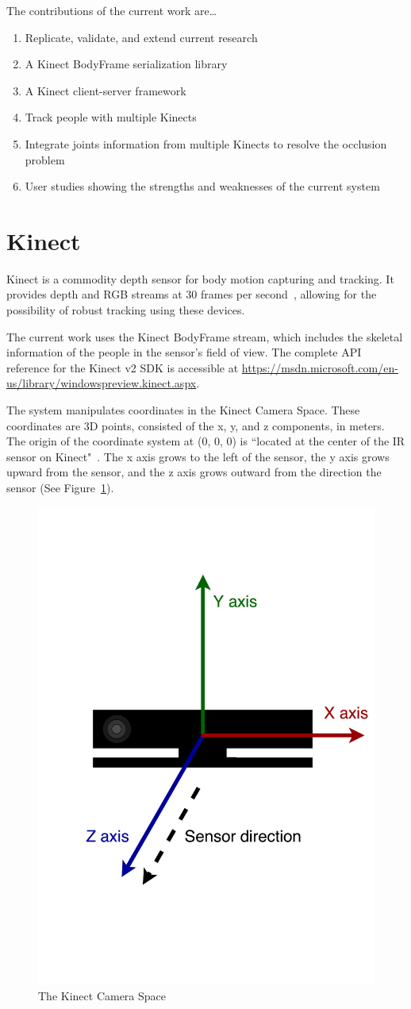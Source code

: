 The contributions of the current work are\ldots

\begin{enumerate}
  \item Replicate, validate, and extend current research
  \item A Kinect BodyFrame serialization library
  \item A Kinect client-server framework
  \item Track people with multiple Kinects
  \item Integrate joints information from multiple Kinects to resolve the occlusion problem
  \item User studies showing the strengths and weaknesses of the current system
\end{enumerate}

\section{Kinect}
\label{sec:introduction_kinect}

Kinect is a commodity depth sensor for body motion capturing and tracking. It provides depth and RGB streams at 30 frames per second~\cite{kinect_sensor_specs}, allowing for the possibility of robust tracking using these devices.

The current work uses the Kinect BodyFrame stream, which includes the skeletal information of the people in the sensor's field of view. The complete API reference for the Kinect v2 SDK is accessible at \url{https://msdn.microsoft.com/en-us/library/windowspreview.kinect.aspx}.

The system manipulates coordinates in the Kinect Camera Space. These coordinates are 3D points, consisted of the x, y, and z components, in meters. The origin of the coordinate system at (0, 0, 0) is ``located at the center of the IR sensor on Kinect"~\cite{microsoft_kinect_coordinates}. The x axis grows to the left of the sensor, the y axis grows upward from the sensor, and the z axis grows outward from the direction the sensor (See Figure~\ref{fig:kinect_camera_space}).


\begin{figure}[!h]
  \centering

  \includegraphics[width=0.5\linewidth]{figs/kinect_camera_space}
  
  \caption{The Kinect Camera Space}
  
  \label{fig:kinect_camera_space}
\end{figure}


